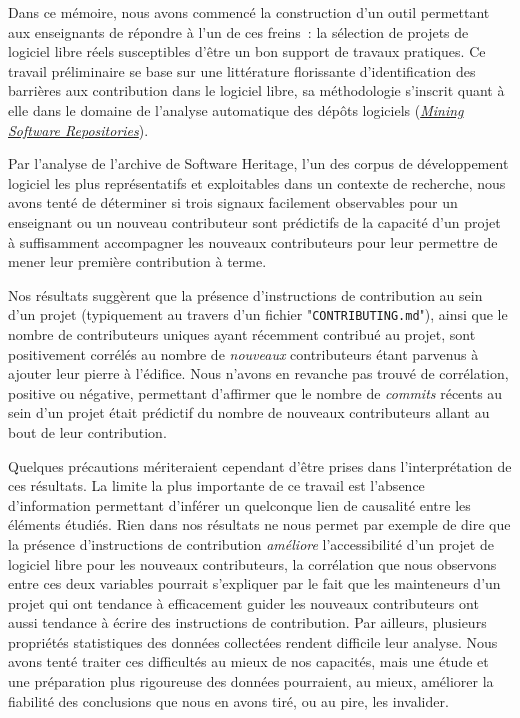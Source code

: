 \documentclass[dvipsnames]{llncs}
\newcommand{\en}[1]{\foreignlanguage{english}{\todo{fix weird hspace}\emph{#1}}}
\begin{document}
    Dans ce mémoire, nous avons commencé la construction d'un outil permettant aux enseignants de répondre à
    l'un de ces freins : la sélection de projets de logiciel libre réels susceptibles d'être un bon support de
    travaux pratiques. Ce travail préliminaire se base sur une littérature florissante d'identification des
    barrières aux contribution dans le logiciel libre, sa méthodologie s'inscrit quant à elle dans le domaine
    de l'analyse automatique des dépôts logiciels (\href{https://conf.researchr.org/series/msr}{\en{Mining
    Software Repositories}}).

    Par l'analyse de l'archive de Software Heritage, l'un des corpus de développement logiciel les plus
    représentatifs et exploitables dans un contexte de recherche, nous avons tenté de déterminer si trois
    signaux facilement observables pour un enseignant ou un nouveau contributeur sont prédictifs de la
    capacité d'un projet à suffisamment accompagner les nouveaux contributeurs pour leur permettre de mener
    leur première contribution à terme.

    Nos résultats suggèrent que la présence d'instructions de contribution au sein d'un projet (typiquement au
    travers d'un fichier "\texttt{CONTRIBUTING.md}"), ainsi que le nombre de contributeurs uniques ayant
    récemment contribué au projet, sont positivement corrélés au nombre de \emph{nouveaux} contributeurs étant
    parvenus à ajouter leur pierre à l'édifice. Nous n'avons en revanche pas trouvé de corrélation, positive
    ou négative, permettant d'affirmer que le nombre de \en{commits} récents au sein d'un projet était
    prédictif du nombre de nouveaux contributeurs allant au bout de leur contribution.

    Quelques précautions mériteraient cependant d'être prises dans l'interprétation de ces résultats. La
    limite la plus importante de ce travail est l'absence d'information permettant d'inférer un quelconque
    lien de causalité entre les éléments étudiés. Rien dans nos résultats ne nous permet par exemple de dire
    que la présence d'instructions de contribution \emph{améliore} l'accessibilité d'un projet de logiciel
    libre pour les nouveaux contributeurs, la corrélation que nous observons entre ces deux variables pourrait
    s'expliquer par le fait que les mainteneurs d'un projet qui ont tendance à efficacement guider les
    nouveaux contributeurs ont aussi tendance à écrire des instructions de contribution. Par ailleurs,
    plusieurs propriétés statistiques des données collectées rendent difficile leur analyse. Nous avons tenté
    traiter ces difficultés au mieux de nos capacités, mais une étude et une préparation plus rigoureuse des
    données pourraient, au mieux, améliorer la fiabilité des conclusions que nous en avons tiré, ou au pire,
    les invalider.
\end{document}

